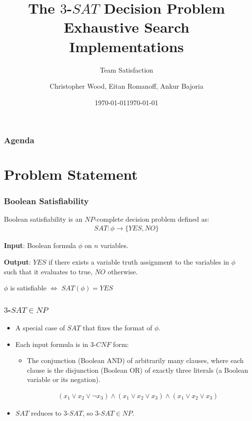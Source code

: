 \documentclass[handout]{beamer}
\title[Team Satisfaction - $3$-$SAT$]{The $3$-$SAT$ Decision Problem \\ Exhaustive Search Implementations}
\institute[RIT]{}
\date{\today}
\subtitle{Team Satisfaction}
\author{Christopher Wood, Eitan Romanoff, Ankur Bajoria}
\date{\today}
\begin{document}
\begin{frame}
	\titlepage
\end{frame}

\begin{frame}
	\frametitle{Agenda}
	\tableofcontents
\end{frame}

\section{Problem Statement}
\begin{frame}
	\frametitle{Boolean Satisfiability}

	Boolean satisfiability is an $NP$-complete decision problem defined as:
	\begin{align*}
	SAT : \phi \to \{YES, NO\}
	\end{align*}

	\medskip

	\textbf{Input}: Boolean formula $\phi$ on $n$ variables.

	\medskip 

	\textbf{Output}: $YES$ if there exists a variable truth assignment to the
	variables in $\phi$ such that it evaluates to true, $NO$ otherwise.

	\medskip

	\begin{center}
		$\phi$ is satisfiable $\Leftrightarrow$ $SAT(\phi) = YES$
	\end{center}

\end{frame}


\begin{frame}
	\frametitle{$3$-$SAT \in NP$}
	\begin{itemize}
		\item A special case of $SAT$ that fixes the format of $\phi$.
		\item Each input formula is in $3$-$CNF$ form:
		\begin{itemize}
			\item The conjunction (Boolean AND) of arbitrarily many clauses, 
			where each clause is the disjunction (Boolean OR) of exactly three literals 
			(a Boolean variable or its negation).

			\begin{align*}
				(x_1 \lor x_2 \lor \lnot x_3) \land (x_1 \lor x_2 \lor x_3) \land (x_1 \lor x_2 \lor x_3)
			\end{align*}

		\end{itemize}
		\item $SAT$ reduces to $3$-$SAT$, so $3$-$SAT \in NP$.
	\end{itemize}
\end{frame}
\end{document}
